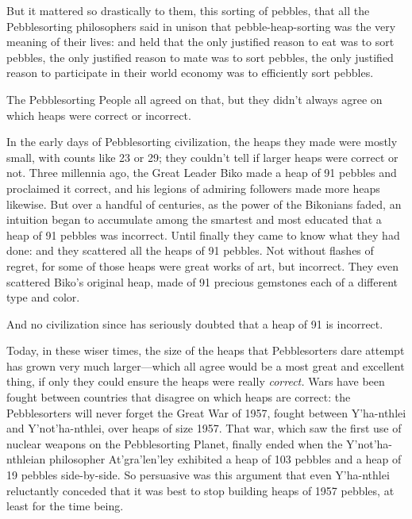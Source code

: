  But it mattered so drastically to them, this sorting of pebbles,
that all the Pebblesorting philosophers said in unison that
pebble-heap-sorting was the very meaning of their lives: and held that
the only justified reason to eat was to sort pebbles, the only
justified reason to mate was to sort pebbles, the only justified reason
to participate in their world economy was to efficiently sort pebbles.


 The Pebblesorting People all agreed on that, but they
didn't always agree on which heaps were correct or
incorrect.


 In the early days of Pebblesorting civilization, the heaps they
made were mostly small, with counts like 23 or 29; they
couldn't tell if larger heaps were correct or not.
Three millennia ago, the Great Leader Biko made a heap of 91 pebbles
and proclaimed it correct, and his legions of admiring followers made
more heaps likewise. But over a handful of centuries, as the power of
the Bikonians faded, an intuition began to accumulate among the
smartest and most educated that a heap of 91 pebbles was incorrect.
Until finally they came to know what they had done: and they scattered
all the heaps of 91 pebbles. Not without flashes of regret, for some of
those heaps were great works of art, but incorrect. They even scattered
Biko's original heap, made of 91 precious gemstones
each of a different type and color.


 And no civilization since has seriously doubted that a heap of 91
is incorrect.


 Today, in these wiser times, the size of the heaps that
Pebblesorters dare attempt has grown very much larger---which all agree
would be a most great and excellent thing, if only they could ensure
the heaps were really \textit{correct.} Wars have been fought between
countries that disagree on which heaps are correct: the Pebblesorters
will never forget the Great War of 1957, fought between
Y'ha-nthlei and
Y'not'ha-nthlei, over heaps of size
1957. That war, which saw the first use of nuclear weapons on the
Pebblesorting Planet, finally ended when the
Y'not'ha-nthleian philosopher
At'gra'len'ley
exhibited a heap of 103 pebbles and a heap of 19 pebbles side-by-side.
So persuasive was this argument that even Y'ha-nthlei
reluctantly conceded that it was best to stop building heaps of 1957
pebbles, at least for the time being.


